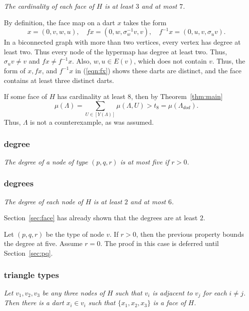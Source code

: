 \documentclass{article} %
\begin{document}
{\it The cardinality of each face of $H$ is at least $3$ and at most $7$.}


By  definition, the face map on a dart $x$ takes the form
\begin{equation}\label{eqn:fx}
x = (0,v,w,u),\quad
f x = (0,w,\sigma_w^{-1}v,v),\quad
f^{-1} x = (0,u,v,\sigma_u v).
\end{equation}
In a biconnected graph with more than two vertices,
every vertex has degree at least two.
Thus every node of the hypermap has degree
at least two.  Thus, $\sigma_u v\ne v$ and $f x\ne f^{-1} x$.
Also, $w,u\in E(v)$, which does not contain $v$.  Thus, 
the form of $x,fx$, and 
$f^{-1} x$
in (\ref{eqn:fx}) shows these darts are distinct, and
the
face contains at least three distinct darts.

If some face of $H$ has cardinality at least $8$, then by Theorem~\ref{thm:main}
$$
\mu(\Lambda) =\sum_{U\in [Y(\Lambda)]}\mu(\Lambda,U) > t_8 =\mu(\Lambda_{dod}).
$$
Thus, $\Lambda$ is not a counterexample, as was assumed.

\subsubsection{degree}

{\it The degree of a node of type $(p,q,r)$ is at most five if $r>0$.}


\subsubsection{degrees}\label{sec:degrees}

{\it The degree of each node of $H$ is at least $2$ and at most $6$.}


Section~\ref{sec:face} has already shown that the degrees are at least $2$.

Let $(p,q,r)$ be the type of node $v$.  If $r>0$, then the previous
property bounds the degree at five.  Assume $r=0$.  The
proof in this case is deferred until Section~\ref{sec:pq}.

\subsubsection{triangle types}

{\it Let $v_1,v_2,v_3$ be any three nodes of $H$ such that $v_i$ is adjacent to $v_j$
for each $i\ne j$.  Then there is a dart $x_i\in v_i$ such that $\{x_1,x_2,x_3\}$ is
a face of $H$.}
\end{document}
